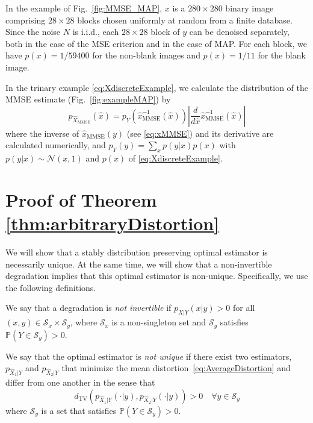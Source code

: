 In the example of Fig.~\ref{fig:MMSE_MAP}, $x$ is a $280 \times 280$ binary image comprising $28\times 28$ blocks chosen uniformly at random from a finite database. Since the noise $N$ is i.i.d., each $28\times 28$ block of $y$ can be denoised separately, both in the case of the MSE criterion and in the case of MAP. For each block, we have $p(x) = 1 / 59400$ for the non-blank images and $p(x) = 1 / 11$ for the blank image.


In the trinary example \eqref{eq:XdiscreteExample}, we calculate the distribution of the MMSE estimate (Fig.~\ref{fig:exampleMAP}) by
\begin{equation}
p_{\hat{X}_{\text{MMSE}}}(\hat{x}) = p_Y(\hat{x}_{\text{MMSE}}^{-1}(\hat{x})) \left\vert \frac{d}{d\hat{x}} \hat{x}_{\text{MMSE}}^{-1}(\hat{x}) \right\vert
\end{equation}
where the inverse of $\hat{x}_{\text{MMSE}}(y)$ (see \eqref{eq:xMMSE}) and its derivative are calculated numerically, and $p_Y(y) = \sum_x p(y \vert x) p(x)$ with $p(y \vert x) \sim \mathcal{N}(x,1)$ and $p(x)$ of \eqref{eq:XdiscreteExample}.


\section{Proof of Theorem \ref{thm:arbitraryDistortion}}\label{ap:distortionProofNonunique}
We will show that a stably distribution preserving optimal estimator is necessarily unique. At the same time, we will show that a non-invertible degradation implies that this optimal estimator is non-unique. Specifically, we use the following definitions.

\begin{definition}\label{def:nonInvertibleDeg}
	We say that a degradation is \emph{not invertible} if $p_{X|Y}(x|y)>0$ for all $(x,y)\in \mathcal{S}_x\times \mathcal{S}_y$, where $\mathcal{S}_x$ is a non-singleton set and $\mathcal{S}_y$ satisfies $\mathbb{P}(Y\in\mathcal{S}_y)>0$.
\end{definition}

\begin{definition}\label{def:notUniqueEstimator}
	We say that the optimal estimator is \emph{not unique} if there exist two estimators, $p_{\hat{X}_1|Y}$ and $p_{\hat{X}_2|Y}$ that minimize the mean distortion~\eqref{eq:AverageDistortion} and differ from one another in the sense that
	\begin{equation}
	    d_{\text{TV}}\left(p_{\hat{X}_1|Y}(\cdot|y),p_{\hat{X}_2|Y}(\cdot|y)\right)>0 \quad \forall y \in \mathcal{S}_y
	\end{equation}
	where $\mathcal{S}_y$ is a set that satisfies $\mathbb{P}(Y\in\mathcal{S}_y)>0$.
\end{definition}


